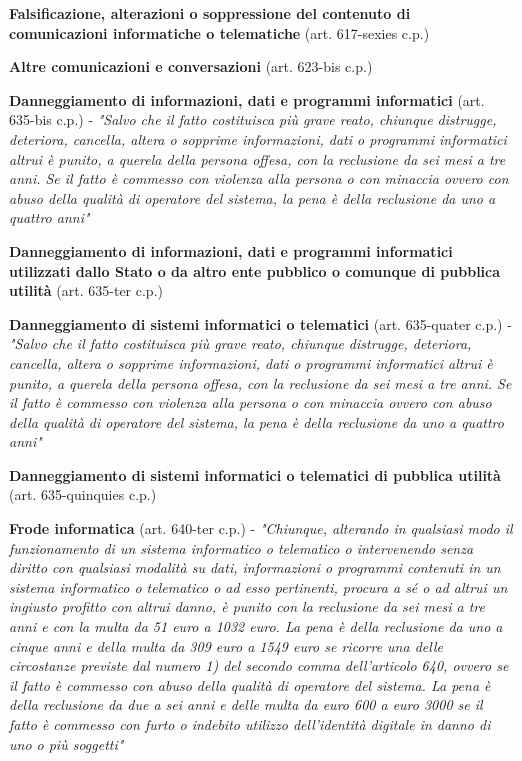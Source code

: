 \vspace{5mm}

\textbf{Falsificazione, alterazioni o soppressione del contenuto di comunicazioni informatiche o telematiche} (art. 617-sexies c.p.)

\vspace{5mm}

\textbf{Altre comunicazioni e conversazioni} (art. 623-bis c.p.)

\vspace{5mm}

\textbf{Danneggiamento di informazioni, dati e programmi informatici} (art. 635-bis c.p.) - \textit{"Salvo che il fatto costituisca più grave reato, chiunque distrugge, deteriora, cancella, altera o sopprime informazioni, dati o programmi informatici altrui è punito, a querela della persona offesa, con la reclusione da sei mesi a tre anni. Se il fatto è commesso con violenza alla persona o con minaccia ovvero con abuso della qualità di operatore del sistema, la pena è della reclusione da uno a quattro anni"}

\vspace{5mm}

\textbf{Danneggiamento di informazioni, dati e programmi informatici utilizzati dallo Stato o da altro ente pubblico o comunque di pubblica utilità} (art. 635-ter c.p.)

\vspace{5mm}

\textbf{Danneggiamento di sistemi informatici o telematici} (art. 635-quater c.p.) - \textit{"Salvo che il fatto costituisca più grave reato, chiunque distrugge, deteriora, cancella, altera o sopprime informazioni, dati o programmi informatici altrui è punito, a querela della persona offesa, con la reclusione da sei mesi a tre anni. Se il fatto è commesso con violenza alla persona o con minaccia ovvero con abuso della qualità di operatore del sistema, la pena è della reclusione da uno a quattro anni"}

\vspace{5mm}

\textbf{Danneggiamento di sistemi informatici o telematici di pubblica utilità} (art. 635-quinquies c.p.)

\vspace{5mm}

\textbf{Frode informatica} (art. 640-ter c.p.) - \textit{"Chiunque, alterando in qualsiasi modo il funzionamento di un sistema informatico o telematico o intervenendo senza diritto con qualsiasi modalità su dati, informazioni o programmi contenuti in un sistema informatico o telematico o ad esso pertinenti, procura a sé o ad altrui un ingiusto profitto con altrui danno, è punito con la reclusione da sei mesi a tre anni e con la multa da 51 euro a 1032 euro. La pena è della reclusione da uno a cinque anni e della multa da 309 euro a 1549 euro se ricorre una delle circostanze previste dal numero 1) del secondo comma dell'articolo 640, ovvero se il fatto è commesso con abuso della qualità di operatore del sistema. La pena è della reclusione da due a sei anni e delle multa da euro 600 a euro 3000 se il fatto è commesso con furto o indebito utilizzo dell'identità digitale in danno di uno o più soggetti"}

